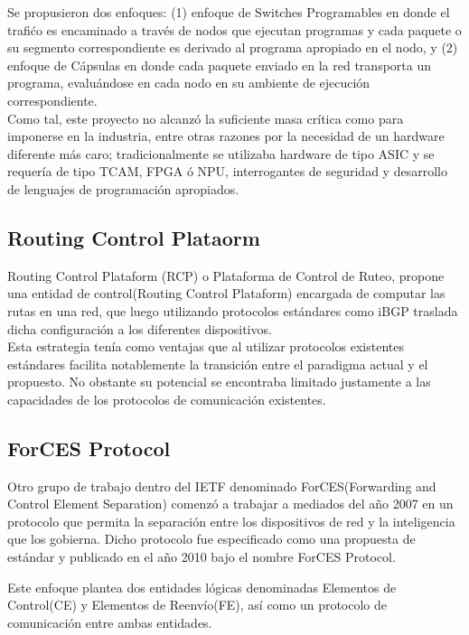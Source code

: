 Se propusieron dos enfoques: (1) enfoque de Switches Programables en donde el trafi\'co es encaminado a través de nodos que ejecutan programas y cada paquete o su segmento correspondiente es derivado al programa apropiado en el nodo, y (2) enfoque de C\'apsulas en donde cada paquete enviado en la red transporta un programa, evaluándose en cada nodo en su ambiente de ejecución correspondiente.\\

Como tal, este proyecto no alcanz\'o la suficiente masa cr\'itica como para imponerse en la industria, entre otras razones por la necesidad de un hardware diferente m\'as caro; tradicionalmente se utilizaba hardware de tipo ASIC y se requería de tipo TCAM, FPGA \'o NPU, interrogantes de seguridad y desarrollo de lenguajes de programación apropiados.

\subsection{Routing Control Plataorm}
Routing Control Plataform (RCP)\citep{feamster2004case}\citep{caesar2005design} o Plataforma de Control de Ruteo, propone una entidad de control(Routing Control Plataform) encargada de computar las rutas en una red, que luego utilizando protocolos estándares como iBGP traslada dicha configuración a los diferentes dispositivos.\\ 

Esta estrategia ten\'ia como ventajas que al utilizar protocolos existentes estándares facilita notablemente la transición entre el paradigma actual y el propuesto. No obstante su potencial 
se encontraba limitado justamente a las capacidades de los protocolos de comunicación existentes.

\subsection{ForCES Protocol}
Otro grupo de trabajo dentro del IETF denominado ForCES(Forwarding and Control Element Separation) comenzó a trabajar a mediados del año 2007 en un protocolo que permita la separación entre los dispositivos de red y la inteligencia que los gobierna. Dicho protocolo fue especificado como una propuesta de estándar y publicado en el año 2010 bajo el nombre ForCES Protocol\citep{doria2010forwarding}.

Este enfoque plantea dos entidades lógicas denominadas Elementos de Control(CE) y Elementos de Reenv\'io(FE), así como un protocolo de comunicación entre ambas entidades.


